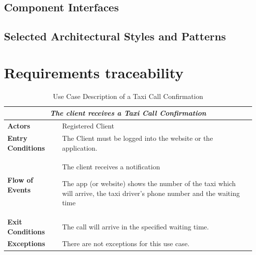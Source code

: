 \documentclass[a4paper]{article}
\let\stdsection\section
\renewcommand\section{\newpage\stdsection}
\begin{document}
\subsection{Component Interfaces}
\subsection{Selected Architectural Styles and Patterns}

\section{Requirements traceability}
\begin{table} [H]
\begin{center}
\begin{tabular}{ |m{}|m{}|  }
\hline
    \multicolumn{2}{|c|}{\textbf{\textit{The client receives a Taxi Call Confirmation}}} \\
\hline \hline
    \textbf{Actors}
&   Registered Client
\\ \hline
    \textbf{Entry Conditions}
&   The Client must be logged into the website or the application.
\\ \hline
    \textbf{Flow of Events}
& 
    \begin{enumerate*}
    \item The client receives a notification
    \item The app (or website) shows the number of the taxi which will arrive, the taxi driver's phone number and the waiting time
    \end{enumerate*}
\\ \hline
    \textbf{Exit Conditions}
&   The call will arrive in the specified waiting time.
\\ \hline
    \textbf{Exceptions}
&   
    There are not exceptions for this use case.
\\ \hline
\end{tabular}
\end{center}
\caption{Use Case Description of a Taxi Call Confirmation}
\label{table:clientconfirmation}
\end{table}
\end{document}
